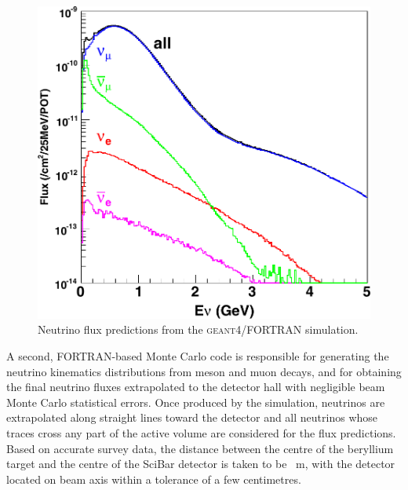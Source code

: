 \begin{figure}
  \centering
  \includegraphics[scale=0.25]{pics/fluxprediction}
  \caption{Neutrino flux predictions from the \textsc{geant4}/FORTRAN simulation.}
  \label{fig:fluxp}
\end{figure}

A second, FORTRAN-based Monte Carlo code is responsible for generating the neutrino %
kinematics distributions from meson and muon decays, and for obtaining the final neutrino %
fluxes extrapolated to the detector hall with negligible beam Monte Carlo statistical errors. 
Once produced by the simulation, neutrinos are extrapolated along straight lines %
toward the detector and all neutrinos whose traces cross any part of the active volume are %
considered for the flux predictions.
Based on accurate survey data, the distance between the centre of the beryllium %
target and the centre of the SciBar detector is taken to be ~m, %
with the detector located on beam axis within a tolerance of a few centimetres. 

